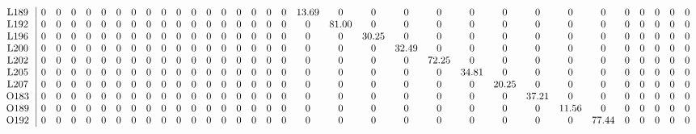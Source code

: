 \begin{table}[H]
\begin{center}
\begin{math}
\begin{array}{c|cccccccccccccccccccccccccccccccc}
\mathrm{L189} \hspace*{2pt} &  0 &  0 &  0 &  0 &  0 &  0 &  0 &  0 &  0 &  0 &  0 &  0 &  0 &  0 &  0 &  0 &  0 &      13.69 &  0 &  0 &  0 &  0 &  0 &  0 &  0 &  0 &  0 &  0 &  0 &  0 &  0 &  0 \\
\mathrm{L192} \hspace*{2pt} &  0 &  0 &  0 &  0 &  0 &  0 &  0 &  0 &  0 &  0 &  0 &  0 &  0 &  0 &  0 &  0 &  0 &  0 &      81.00 &  0 &  0 &  0 &  0 &  0 &  0 &  0 &  0 &  0 &  0 &  0 &  0 &  0 \\
\mathrm{L196} \hspace*{2pt} &  0 &  0 &  0 &  0 &  0 &  0 &  0 &  0 &  0 &  0 &  0 &  0 &  0 &  0 &  0 &  0 &  0 &  0 &  0 &      30.25 &  0 &  0 &  0 &  0 &  0 &  0 &  0 &  0 &  0 &  0 &  0 &  0 \\
\mathrm{L200} \hspace*{2pt} &  0 &  0 &  0 &  0 &  0 &  0 &  0 &  0 &  0 &  0 &  0 &  0 &  0 &  0 &  0 &  0 &  0 &  0 &  0 &  0 &      32.49 &  0 &  0 &  0 &  0 &  0 &  0 &  0 &  0 &  0 &  0 &  0 \\
\mathrm{L202} \hspace*{2pt} &  0 &  0 &  0 &  0 &  0 &  0 &  0 &  0 &  0 &  0 &  0 &  0 &  0 &  0 &  0 &  0 &  0 &  0 &  0 &  0 &  0 &      72.25 &  0 &  0 &  0 &  0 &  0 &  0 &  0 &  0 &  0 &  0 \\
\mathrm{L205} \hspace*{2pt} &  0 &  0 &  0 &  0 &  0 &  0 &  0 &  0 &  0 &  0 &  0 &  0 &  0 &  0 &  0 &  0 &  0 &  0 &  0 &  0 &  0 &  0 &      34.81 &  0 &  0 &  0 &  0 &  0 &  0 &  0 &  0 &  0 \\
\mathrm{L207} \hspace*{2pt} &  0 &  0 &  0 &  0 &  0 &  0 &  0 &  0 &  0 &  0 &  0 &  0 &  0 &  0 &  0 &  0 &  0 &  0 &  0 &  0 &  0 &  0 &  0 &      20.25 &  0 &  0 &  0 &  0 &  0 &  0 &  0 &  0 \\
\mathrm{O183} \hspace*{2pt} &  0 &  0 &  0 &  0 &  0 &  0 &  0 &  0 &  0 &  0 &  0 &  0 &  0 &  0 &  0 &  0 &  0 &  0 &  0 &  0 &  0 &  0 &  0 &  0 &      37.21 &  0 &  0 &  0 &  0 &  0 &  0 &  0 \\
\mathrm{O189} \hspace*{2pt} &  0 &  0 &  0 &  0 &  0 &  0 &  0 &  0 &  0 &  0 &  0 &  0 &  0 &  0 &  0 &  0 &  0 &  0 &  0 &  0 &  0 &  0 &  0 &  0 &  0 &      11.56 &  0 &  0 &  0 &  0 &  0 &  0 \\
\mathrm{O192} \hspace*{2pt} &  0 &  0 &  0 &  0 &  0 &  0 &  0 &  0 &  0 &  0 &  0 &  0 &  0 &  0 &  0 &  0 &  0 &  0 &  0 &  0 &  0 &  0 &  0 &  0 &  0 &  0 &      77.44 &  0 &  0 &  0 &  0 &  0 \\

\end{array}
\end{math}
\end{center}
\end{table}
